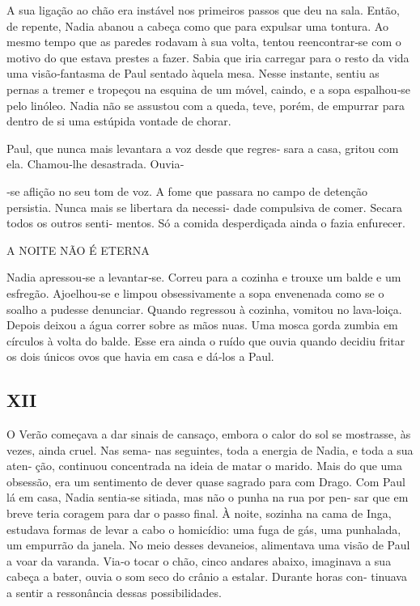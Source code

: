 A sua ligação ao chão era instável nos primeiros passos que deu na sala.
Então, de repente, Nadia abanou a cabeça como que para expulsar uma
tontura. Ao mesmo tempo que as paredes rodavam à sua volta, tentou
reencontrar‑se com o motivo do que estava prestes a fazer. Sabia que
iria carregar para o resto da vida uma visão‑fantasma de Paul sentado
àquela mesa. Nesse instante, sentiu as pernas a tremer e tropeçou na
esquina de um móvel, caindo, e a sopa espalhou‑se pelo linóleo. Nadia
não se assustou com a queda, teve, porém, de empurrar para dentro de si
uma estúpida vontade de chorar.

Paul, que nunca mais levantara a voz desde que regres‑ sara a casa,
gritou com ela. Chamou‑lhe desastrada. Ouvia‑

‑se aflição no seu tom de voz. A fome que passara no campo de detenção
persistia. Nunca mais se libertara da necessi‑ dade compulsiva de comer.
Secara todos os outros senti‑ mentos. Só a comida desperdiçada ainda o
fazia enfurecer.

A NOITE NÃO É ETERNA

Nadia apressou‑se a levantar‑se. Correu para a cozinha e trouxe um balde
e um esfregão. Ajoelhou‑se e limpou obsessivamente a sopa envenenada
como se o soalho a pudesse denunciar. Quando regressou à cozinha,
vomitou no lava‑loiça. Depois deixou a água correr sobre as mãos nuas.
Uma mosca gorda zumbia em círculos à volta do balde. Esse era ainda o
ruído que ouvia quando decidiu fritar os dois únicos ovos que havia em
casa e dá‑los a Paul.

\subsection{XII}

O Verão começava a dar sinais de cansaço, embora o calor do sol se
mostrasse, às vezes, ainda cruel. Nas sema‑ nas seguintes, toda a
energia de Nadia, e toda a sua aten‑ ção, continuou concentrada na ideia
de matar o marido. Mais do que uma obsessão, era um sentimento de dever
quase sagrado para com Drago. Com Paul lá em casa, Nadia sentia‑se
sitiada, mas não o punha na rua por pen‑ sar que em breve teria coragem
para dar o passo final. À noite, sozinha na cama de Inga, estudava
formas de levar a cabo o homicídio: uma fuga de gás, uma punhalada, um
empurrão da janela. No meio desses devaneios, alimentava uma visão de
Paul a voar da varanda. Via‑o tocar o chão, cinco andares abaixo,
imaginava a sua cabeça a bater, ouvia o som seco do crânio a estalar.
Durante horas con‑ tinuava a sentir a ressonância dessas possibilidades.

